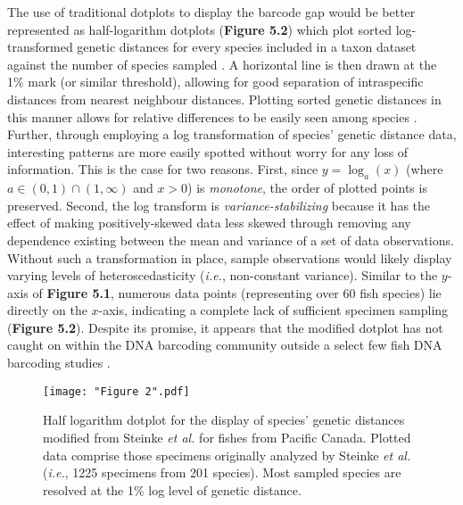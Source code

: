 The use of traditional dotplots to display the barcode gap would be better represented as half-logarithm dotplots (\textbf{Figure 5.2}) which plot sorted log-transformed genetic distances for every species included in a taxon dataset against the number of species sampled \cite{steinke2009dna, steinke2009barcoding}. A horizontal line is then drawn at the 1\% mark (or similar threshold), allowing for good separation of intraspecific distances from nearest neighbour distances. Plotting sorted genetic distances in this manner allows for relative differences to be easily seen among species \cite{steinke2009dna}. Further, through employing a log transformation of species' genetic distance data, interesting patterns are more easily spotted without worry for any loss of information. This is the case for two reasons. First, since $y = \log_{a}(x)$ (where $a \in (0, 1) \cap (1, \infty)$ and $x>0$) is \textit{monotone}, the order of plotted points is preserved. Second, the log transform is \textit{variance-stabilizing} because it has the effect of making positively-skewed data less skewed through removing any dependence existing between the mean and variance of a set of data observations. Without such a transformation in place, sample observations would likely display varying levels of heteroscedasticity (\textit{i.e.}, non-constant variance). Similar to the $y$-axis of \textbf{Figure 5.1}, numerous data points (representing over 60 fish species) lie directly on the $x$-axis, indicating a complete lack of sufficient specimen sampling (\textbf{Figure 5.2}). Despite its promise, it appears that the modified dotplot has not caught on within the DNA barcoding community outside a select few fish DNA barcoding studies \cite{steinke2009dna, steinke2009barcoding}. 

\begin{figure}[H]

\centering

\texttt{[image: "Figure 2".pdf]}

\caption[Depiction of intraspecific and interspecific genetic distances as a modified dotplot for Canadian Pacific fishes assessed by Steinke \textit{et al.} \cite{steinke2009dna}.]{Half logarithm dotplot for the display of species' genetic distances modified from Steinke \textit{et al.} \cite{steinke2009dna} for fishes from Pacific Canada. Plotted data comprise those specimens originally analyzed by Steinke \textit{et al.} \cite{steinke2009dna} (\textit{i.e.}, 1225 specimens from 201 species). Most sampled species are resolved at the 1\% log level of genetic distance.}

\end{figure}



